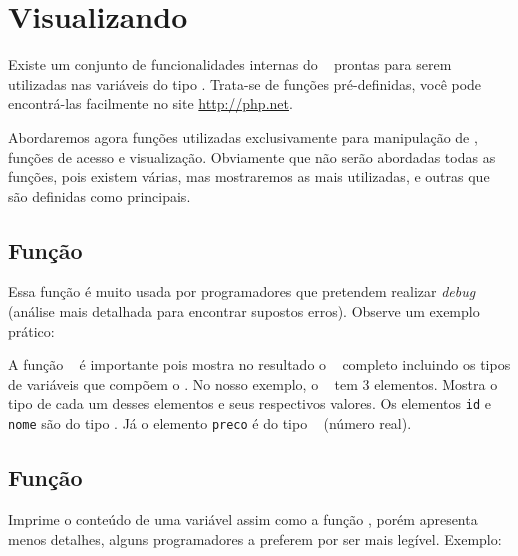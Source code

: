 

\section{Visualizando \tipoarrays}
\label{visualizando-arrays}

Existe um conjunto de funcionalidades internas do \php~ prontas para serem utilizadas nas variáveis
do tipo \tipoarray. Trata-se de funções pré-definidas, você pode encontrá-las facilmente no 
site \url{http://php.net}.

Abordaremos agora funções utilizadas exclusivamente para manipulação de \tipoarray, 
funções de acesso e visualização. Obviamente que não serão abordadas todas as funções, 
pois existem várias, mas mostraremos as mais utilizadas, e outras que são definidas como principais.

\subsection{Função \funcaovardump}
\label{funcao-vardump}

Essa função é muito usada por programadores que pretendem realizar \textit{debug}
(análise mais detalhada para encontrar supostos erros). Observe um exemplo prático:




A função \funcaovardump~ é importante pois mostra no resultado o \tipoarray~ completo
incluindo os tipos de variáveis que compõem o \tipoarray. No nosso exemplo, o \tipoarray~
tem 3 elementos. Mostra o tipo de cada um desses elementos e seus respectivos valores. 
Os elementos \texttt{id} e \texttt{nome} são do tipo \tipostring. Já o elemento 
\texttt{preco} é do tipo \tipofloat~ (número real).

\subsection{Função \funcaoprintr}
\label{funcao-printr}

Imprime o conteúdo de uma variável assim como a função \funcaovardump, porém apresenta 
menos detalhes, alguns programadores a preferem por ser mais legível. Exemplo:



